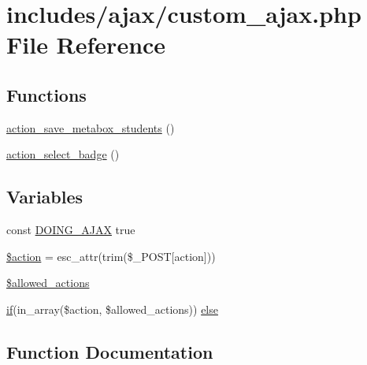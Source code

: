\hypertarget{custom__ajax_8php}{}\section{includes/ajax/custom\+\_\+ajax.php File Reference}
\label{custom__ajax_8php}
\subsection*{Functions}
\begin{DoxyCompactItemize}
\item 
\hyperlink{custom__ajax_8php_a325ee68531e7ddf3b7494842c239f436}{action\+\_\+save\+\_\+metabox\+\_\+students} ()
\item 
\hyperlink{custom__ajax_8php_a12637c077e92f04bbc103ae80e4eee34}{action\+\_\+select\+\_\+badge} ()
\end{DoxyCompactItemize}
\subsection*{Variables}
\begin{DoxyCompactItemize}
\item 
const \hyperlink{custom__ajax_8php_a0597550ce673ad79c507bfa03dcf0ef4}{D\+O\+I\+N\+G\+\_\+\+A\+J\+AX} true
\item 
\hyperlink{custom__ajax_8php_aa698a3e72116e8e778be0e95d908ee30}{\$action} = esc\+\_\+attr(trim(\$\+\_\+\+P\+O\+ST\mbox{[}\textquotesingle{}action\textquotesingle{}\mbox{]}))
\item 
\hyperlink{custom__ajax_8php_a24eb78517c7ce15d317b8f3a15418fde}{\$allowed\+\_\+actions}
\item 
\hyperlink{comments__template_8php_aa69d65d13534429621eba50597158c85}{if}(in\+\_\+array(\$action, \$allowed\+\_\+actions)) \hyperlink{custom__ajax_8php_afe9583916c08b3e16da43b3a3c6e9a3c}{else}
\end{DoxyCompactItemize}


\subsection{Function Documentation}
\mbox{\label{custom__ajax_8php_a325ee68531e7ddf3b7494842c239f436}} 

